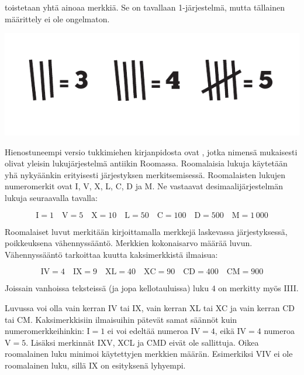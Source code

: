 toistetaan yhtä ainoaa merkkiä. Se on tavallaan 1-järjestelmä, mutta tällainen määrittely ei ole ongelmaton.

\begin{center}
	\includegraphics{pictures/Kuva1-1-tukkimiehenkirjanpito.pdf}
\end{center}

Hienostuneempi versio tukkimiehen kirjanpidosta ovat , jotka nimensä mukaisesti olivat yleisin lukujärjestelmä antiikin Roomassa. Roomalaisia lukuja käytetään yhä nykyäänkin erityisesti järjestyksen merkitsemisessä. Roomalaisten lukujen numeromerkit ovat I, V, X, L, C, D ja M. Ne vastaavat desimaalijärjestelmän lukuja seuraavalla tavalla:

\begin{equation*}
	\textrm{I}=1\quad
	\textrm{V}=5\quad
	\textrm{X}=10\quad
	\textrm{L}=50\quad
	\textrm{C}=100\quad
	\textrm{D}=500\quad
	\textrm{M}=1\,000
\end{equation*}

Roomalaiset luvut merkitään kirjoittamalla merkkejä laskevassa järjestyksessä, poikkeuksena vähennyssääntö. Merkkien kokonaisarvo määrää luvun. Vähennyssääntö tarkoittaa kuutta kaksimerkkistä ilmaisua:

\begin{equation*}
	\textrm{IV}=4\quad
	\textrm{IX}=9\quad
	\textrm{XL}=40\quad
	\textrm{XC}=90\quad
	\textrm{CD}=400\quad
	\textrm{CM}=900
\end{equation*}

Joissain vanhoissa teksteissä (ja jopa kellotauluissa) luku $4$ on merkitty myös IIII.

Luvussa voi olla vain kerran IV tai IX, vain kerran XL tai XC ja vain kerran CD tai CM. Kaksimerkkisiin ilmaisuihin pätevät samat säännöt kuin numeromerkkeihinkin: I$=1$ ei voi edeltää numeroa IV$=4$, eikä IV$=4$ numeroa V$=5$. Lisäksi merkinnät IXV, XCL ja CMD eivät ole sallittuja. Oikea roomalainen luku minimoi käytettyjen merkkien määrän. Esimerkiksi VIV ei ole roomalainen luku, sillä IX on esityksenä lyhyempi.

